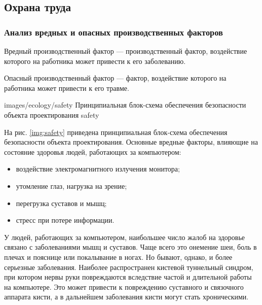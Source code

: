 \subsection{Охрана труда}
\subsubsection{Анализ вредных и опасных производственных факторов}
Вредный производственный фактор --- производственный фактор, воздействие которого на работника может привести к его заболеванию.

Опасный производственный фактор --- фактор, воздействие которого на работника может привести к его травме.

             {images/ecology/safety}
             {Принципиальная блок-схема обеспечения безопасности объекта проектирования}
             {safety}

На рис. \ref{img:safety} приведена принципиальная блок-схема обеспечения безопасности объекта проектирования.
Основные вредные факторы, влияющие на состояние здоровья людей, работающих за компьютером:
\begin{itemize}
  \item{воздействие электромагнитного излучения монитора;}
  \item{утомление глаз, нагрузка на зрение;}
  \item{перегрузка суставов и мышц;}
  \item{стресс при потере информации.}
\end{itemize}
У людей, работающих за компьютером, наибольшее число жалоб на здоровье связано с заболеваниями мышц и суставов.
Чаще всего это онемение шеи, боль в плечах и пояснице или покалывание в ногах. Но бывают, однако, и более серьезные заболевания. Наиболее распространен кистевой туннельный синдром, при котором нервы руки повреждаются вследствие частой и длительной работы на компьютере. Это может привести к повреждению суставного и связочного аппарата кисти, а в дальнейшем заболевания кисти могут стать хроническими.
